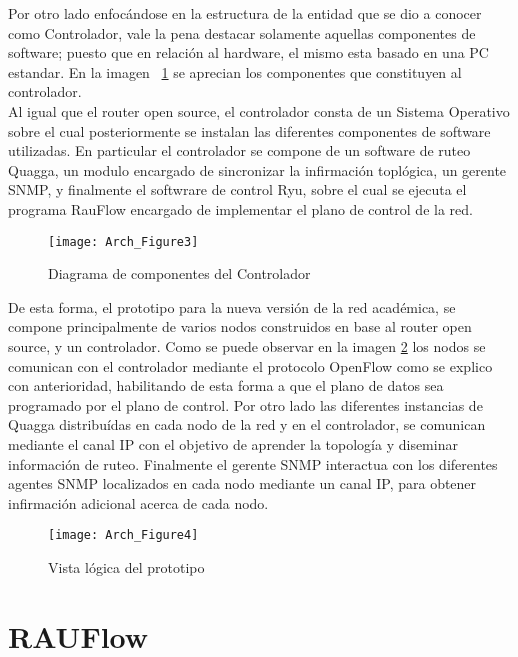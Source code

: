 \newpage
Por otro lado enfoc\'andose en la estructura de la entidad que se dio a conocer como Controlador, vale la pena destacar solamente aquellas componentes de software; puesto que en relaci\'on al hardware, el mismo esta basado en una PC estandar. En la imagen ~\ref{fig:OpenSourceRArch3} se aprecian los componentes que constituyen al controlador.\\

Al igual que el router open source, el controlador consta de un Sistema Operativo sobre el cual posteriormente se instalan las diferentes componentes de software utilizadas. En particular el controlador se compone de un software de ruteo Quagga, un modulo encargado de sincronizar la infirmaci\'on topl\'ogica, un gerente SNMP, y finalmente el softwrare de control Ryu, sobre el cual se ejecuta el programa RauFlow encargado de implementar el plano de control de la red.

\begin{figure}[htbp!] 
\centering    
\texttt{[image: Arch\_Figure3]}
\caption[OpenSourceRArch3]{Diagrama de componentes del Controlador}
\label{fig:OpenSourceRArch3}
\end{figure}

De esta forma, el prototipo para la nueva versi\'on de la red acad\'emica, se compone principalmente de varios nodos construidos en base al router open source, y un controlador. Como se puede observar en la imagen \ref{fig:OpenSourceRArch4} los nodos se comunican con el controlador mediante el protocolo OpenFlow como se explico con anterioridad, habilitando de esta forma a que el plano de datos sea programado por el plano de control. Por otro lado las diferentes instancias de Quagga distribu\'idas en cada nodo de la red y en el controlador, se comunican mediante el canal IP con el objetivo de aprender la topolog\'ia y diseminar informaci\'on de ruteo. Finalmente el gerente SNMP interactua con los diferentes agentes SNMP localizados en cada nodo mediante un canal IP, para obtener infirmaci\'on adicional acerca de cada nodo. 

\begin{figure}[htbp!] 
\centering    
\texttt{[image: Arch\_Figure4]}
\caption[OpenSourceRArch4]{Vista l\'ogica del prototipo}
\label{fig:OpenSourceRArch4}
\end{figure}

\section[RAUFlow]{RAUFlow}

